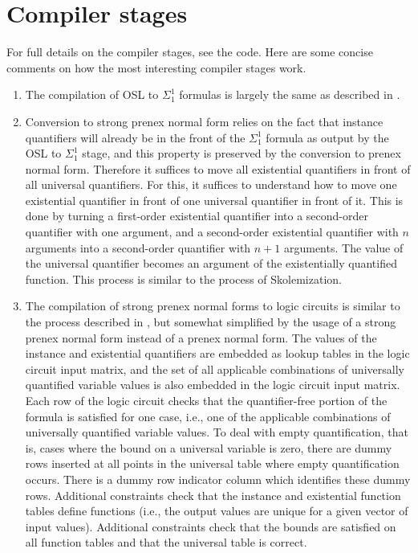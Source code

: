 \documentclass[11pt]{article}
\begin{document}
\section{Compiler stages}

For full details on the compiler stages, see the code. \cite{osl-github} Here are some concise comments on how the most interesting compiler stages work.

\begin{enumerate}
	\item The compilation of OSL to $\Sigma^1_1$ formulas is largely the same as described in \cite{osl-paper}. 
	\item Conversion to strong prenex normal form relies on the fact that instance quantifiers will already be in the front of the $\Sigma^1_1$ formula as output by the OSL to $\Sigma^1_1$ stage, and this property is preserved by the conversion to prenex normal form. Therefore it suffices to move all existential quantifiers in front of all universal quantifiers. For this, it suffices to understand how to move one existential quantifier in front of one universal quantifier in front of it. This is done by turning a first-order existential quantifier into a second-order quantifier with one argument, and a second-order existential quantifier with $n$ arguments into a second-order quantifier with $n+1$ arguments. The value of the universal quantifier becomes an argument of the existentially quantified function. This process is similar to the process of Skolemization.
	\item The compilation of strong prenex normal forms to logic circuits is similar to the process described in \cite{sigma11-poly-bounds}, but somewhat simplified by the usage of a strong prenex normal form instead of a prenex normal form. The values of the instance and existential quantifiers are embedded as lookup tables in the logic circuit input matrix, and the set of all applicable combinations of universally quantified variable values is also embedded in the logic circuit input matrix. Each row of the logic circuit checks that the quantifier-free portion of the formula is satisfied for one case, i.e., one of the applicable combinations of universally quantified variable values. To deal with empty quantification, that is, cases where the bound on a universal variable is zero, there are dummy rows inserted at all points in the universal table where empty quantification occurs. There is a dummy row indicator column which identifies these dummy rows. Additional constraints check that the instance and existential function tables define functions (i.e., the output values are unique for a given vector of input values). Additional constraints check that the bounds are satisfied on all function tables and that the universal table is correct.

\end{enumerate}
\end{document}
